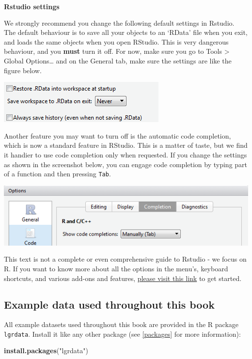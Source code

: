 \documentclass[]{book}
\newenvironment{Shaded}{\begin{snugshade}}{\end{snugshade}}
\newcommand{\KeywordTok}[1]{\textcolor[rgb]{0.13,0.29,0.53}{\textbf{#1}}}
\newcommand{\NormalTok}[1]{#1}
\newcommand{\StringTok}[1]{\textcolor[rgb]{0.31,0.60,0.02}{#1}}
\let\BeginKnitrBlock\begin \let\EndKnitrBlock\end
\begin{document}
\textbf{Rstudio settings}

We strongly recommend you change the following default settings in Rstudio. The default behaviour is to save all your objects to an `RData' file when you exit, and loads the same objects when you open RStudio. This is very dangerous behaviour, and you \textbf{must} turn it off. For now, make sure you go to Tools \textgreater{} Global Options\ldots{} and on the General tab, make sure the settings are like the figure below.

\includegraphics[width=0.4\linewidth]{screenshots/neverloadrdata}

Another feature you may want to turn off is the automatic code completion, which is now a standard feature in RStudio. This is a matter of taste, but we find it handier to use code completion only when requested. If you change the settings as shown in the screenshot below, you can engage code completion by typing part of a function and then pressing \texttt{Tab}.

\includegraphics[width=0.4\linewidth]{screenshots/rstudionocodecomplete}

\BeginKnitrBlock{rmdreading}
This text is not a complete or even comprehensive guide to Rstudio - we focus on R. If you want to know more about all the options in the menu's, keyboard shortcuts, and various add-ons and features, \href{https://support.rstudio.com/hc/en-us/sections/200107586-Using-the-RStudio-IDE}{please visit this link} to get started.
\EndKnitrBlock{rmdreading}

\hypertarget{exampledata}{%
\subsection{Example data used throughout this book}\label{exampledata}}

All example datasets used throughout this book are provided in the R package \texttt{lgrdata}. Install it like any other package (see \ref{packages} for more information):

\begin{Shaded}
\begin{Highlighting}[]
\KeywordTok{install.packages}\NormalTok{(}\StringTok{"lgrdata"}\NormalTok{)}
\end{Highlighting}
\end{Shaded}
\end{document}
